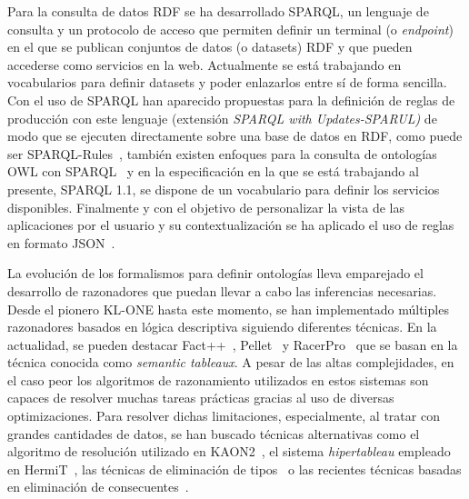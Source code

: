 Para la consulta de datos \gls{RDF} se ha desarrollado \gls{SPARQL}, un lenguaje de consulta y un
protocolo de acceso que permiten definir un terminal (o \textit{endpoint}) en el que se publican conjuntos de datos (o datasets) RDF y que pueden accederse
como servicios en la web. Actualmente se está trabajando en vocabularios para
definir datasets y poder enlazarlos entre sí de forma sencilla. Con el uso de
SPARQL han aparecido propuestas para la definición de reglas de producción con
este lenguaje (extensión \textit{SPARQL with Updates-\gls{SPARUL})} de modo que se ejecuten
directamente sobre una base de datos en RDF, como puede ser SPARQL-Rules~\cite{citeulike:1294570},
también existen enfoques para la consulta de ontologías OWL con SPARQL~\cite{Sirin07sparql-dl:sparql} y
en la especificación en la que se está trabajando al presente, SPARQL 1.1, se
dispone de un vocabulario para definir los servicios disponibles. Finalmente y
con el objetivo de personalizar la vista de las aplicaciones por el usuario y su
contextualización se ha aplicado el uso de reglas en formato \gls{JSON}~\cite{conf/ki/GiurcaP08}. 


La evolución de los formalismos para definir ontologías lleva emparejado el
desarrollo de razonadores que puedan llevar a cabo las inferencias necesarias.
Desde el pionero KL-ONE hasta este momento, se han implementado múltiples
razonadores basados en lógica descriptiva siguiendo diferentes técnicas. En la
actualidad, se pueden destacar Fact++~\cite{Tsarkov2006}, Pellet~\cite{Sirin_Parsia_Grau_Kalyanpur_Katz_2007} y RacerPro~\cite{Rajeev2001Racer}
que se basan en la técnica conocida como \textit{semantic tableaux}. A pesar de las altas
complejidades, en el caso peor los algoritmos de razonamiento utilizados en estos sistemas son capaces de resolver muchas tareas prácticas gracias al uso de
diversas optimizaciones. Para resolver dichas limitaciones, especialmente, al
tratar con grandes cantidades de datos, se han buscado técnicas alternativas
como el algoritmo de resolución utilizado en KAON2~\cite{journals/ercim/Motik08}, el sistema
\textit{hipertableau} empleado en HermiT~\cite{msh09hypertableau}, las técnicas de eliminación de tipos~\cite{DBLP:conf/aaai/RudolphKH08}
 o las recientes técnicas basadas en eliminación de consecuentes~\cite{DBLP:conf/ijcai/SimancikKH11}.

